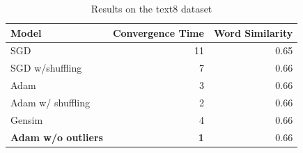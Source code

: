 \begin{table}[tb]
    \caption{Results on the text8 dataset}
    \begin{tabular}{l r r }
        \toprule
Model    & Convergence Time & Word Similarity \\ \hline
SGD & {11}              & 0.65            \\ 
SGD w/shuffling & {7}              & 0.66            \\ 
Adam & {3}              & 0.66            \\ 
Adam w/ shuffling & {2}              & 0.66      \\ 
Gensim   & 4          & 0.66            \\ \hline
\textbf{Adam w/o outliers }& \textbf{1} & 0.66 \\  \hline
\bottomrule
\end{tabular}
\end{table}
